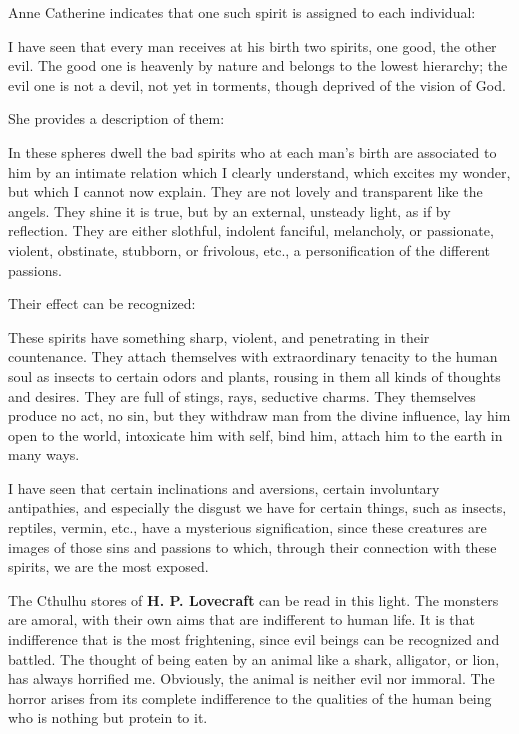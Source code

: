 Anne Catherine indicates that one such spirit is assigned to each individual:

\begin{quotex}
I have seen that every man receives at his birth two spirits, one good, the other evil. The good one is heavenly by nature and belongs to the lowest hierarchy; the evil one is not a devil, not yet in torments, though deprived of the vision of God.
\end{quotex}


She provides a description of them:

\begin{quotex}
In these spheres dwell the bad spirits who at each man's birth are associated to him by an intimate relation which I clearly understand, which excites my wonder, but which I cannot now explain. They are not lovely and transparent like the angels. They shine it is true, but by an external, unsteady light, as if by reflection. They are either slothful, indolent fanciful, melancholy, or passionate, violent, obstinate, stubborn, or frivolous, etc., a personification of the different passions.
\end{quotex}


Their effect can be recognized:

\begin{quotationx}
These spirits have something sharp, violent, and penetrating in their countenance. They attach themselves with extraordinary tenacity to the human soul as insects to certain odors and plants, rousing in them all kinds of thoughts and desires. They are full of stings, rays, seductive charms. They themselves produce no act, no sin, but they withdraw man from the divine influence, lay him open to the world, intoxicate him with self, bind him, attach him to the earth in many ways.

I have seen that certain inclinations and aversions, certain involuntary antipathies, and especially the disgust we have for certain things, such as insects, reptiles, vermin, etc., have a mysterious signification, since these creatures are images of those sins and passions to which, through their connection with these spirits, we are the most exposed.
\end{quotationx}


The Cthulhu stores of \textbf{H. P. Lovecraft} can be read in this light. The monsters are amoral, with their own aims that are indifferent to human life. It is that indifference that is the most frightening, since evil beings can be recognized and battled. The thought of being eaten by an animal like a shark, alligator, or lion, has always horrified me. Obviously, the animal is neither evil nor immoral. The horror arises from its complete indifference to the qualities of the human being who is nothing but protein to it.

